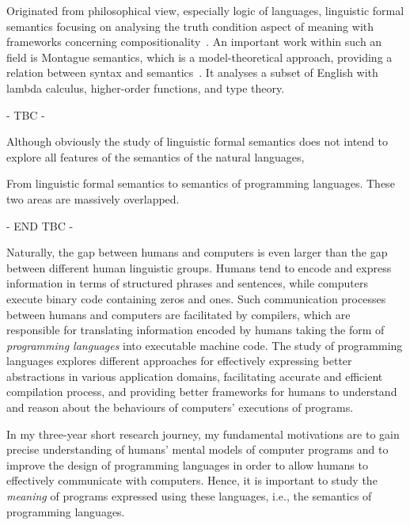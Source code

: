 Originated from philosophical view, especially logic of languages, linguistic formal semantics focusing on analysing the truth condition aspect of meaning with frameworks concerning compositionality~\citep{alma999704883502466}. An important work within such an field is Montague semantics, which is a model-theoretical approach, providing a relation between syntax and semantics~\citep{Montague1970-MONEAA-2}. It analyses a subset of English with lambda calculus, higher-order functions, and type theory.

- TBC -

Although obviously the study of linguistic formal semantics does not intend to explore all features of the semantics of the natural languages, 

From linguistic formal semantics to semantics of programming languages. These two areas are massively overlapped.

- END TBC -

Naturally, the gap between humans and computers is even larger than the gap between different human linguistic groups. Humans tend to encode and express information in terms of structured phrases and sentences, while computers execute binary code containing zeros and ones. Such communication processes between humans and computers are facilitated by compilers, which are responsible for translating information encoded by humans taking the form of \emph{programming languages} into executable machine code. The study of programming languages explores different approaches for effectively expressing better abstractions in various application domains, facilitating accurate and efficient compilation process, and providing better frameworks for humans to understand and reason about the behaviours of computers' executions of programs.

In my three-year short research journey, my fundamental motivations are to gain precise understanding of humans' mental models of computer programs and to improve the design of programming languages in order to allow humans to effectively communicate with computers. Hence, it is important to study the \emph{meaning} of programs expressed using these languages, i.e., the semantics of programming languages.


